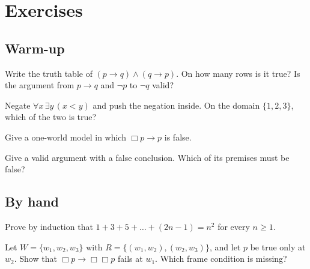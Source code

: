 
\section*{Exercises}

\subsection*{Warm-up}

\begin{exercise}\label{exr:ch10:tt}
Write the truth table of $(p\to q)\wedge(q\to p)$. On how many rows is it true? Is the argument from $p\to q$ and $\neg p$ to $\neg q$ valid?
\end{exercise}

\begin{exercise}\label{exr:ch10:neg}
Negate $\forall x\,\exists y\,(x<y)$ and push the negation inside. On the domain $\{1,2,3\}$, which of the two is true?
\end{exercise}

\begin{exercise}\label{exr:ch10:T}
Give a one-world model in which $\Box p\to p$ is false.
\end{exercise}

\begin{exercise}\label{exr:ch10:sound}
Give a valid argument with a false conclusion. Which of its premises must be false?
\end{exercise}

\subsection*{By hand}

\begin{exercise}\label{exr:ch10:odd}
Prove by induction that $1+3+5+\dots+(2n-1)=n^2$ for every $n\ge1$.
\end{exercise}

\begin{exercise}\label{exr:ch10:four}
Let $W=\{w_1,w_2,w_3\}$ with $R=\{(w_1,w_2),(w_2,w_3)\}$, and let $p$ be true only at $w_2$. Show that $\Box p\to\Box\Box p$ fails at $w_1$. Which frame condition is missing?
\end{exercise}

